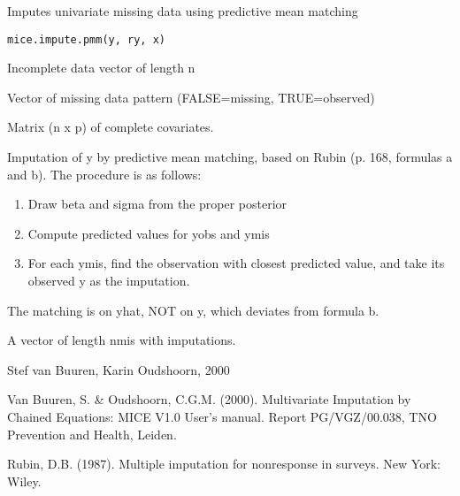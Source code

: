 \begin{Description}\relax
Imputes univariate missing data using predictive mean matching
\end{Description}
\begin{Usage}
\begin{verbatim}
mice.impute.pmm(y, ry, x)
\end{verbatim}
\end{Usage}
\begin{Arguments}
\begin{ldescription}
\item[\code{y}] Incomplete data vector of length n
\item[\code{ry}] Vector of missing data pattern (FALSE=missing, TRUE=observed)
\item[\code{x}] Matrix (n x p) of complete covariates.
\end{ldescription}
\end{Arguments}
\begin{Details}\relax
Imputation of y by predictive mean matching, based on
Rubin (p. 168, formulas a and b).
The procedure is as follows:
\begin{enumerate}
\item Draw beta and sigma from the proper posterior
\item Compute predicted values for yobs and ymis
\item For each ymis, find the observation with closest predicted
value, and take its observed y as the imputation.
\end{enumerate}
The matching is on yhat, NOT on y, which deviates from formula b.
\end{Details}
\begin{Value}
\begin{ldescription}
\item[\code{imp}] A vector of length nmis with imputations.
\end{ldescription}
\end{Value}
\begin{Author}\relax
Stef van Buuren, Karin Oudshoorn, 2000
\end{Author}
\begin{References}\relax
Van Buuren, S. \& Oudshoorn, C.G.M. (2000). Multivariate Imputation by Chained Equations: 
MICE V1.0 User's manual. Report PG/VGZ/00.038, TNO Prevention and Health, Leiden.

Rubin, D.B. (1987). Multiple imputation for nonresponse in surveys. New York: Wiley.
\end{References}

